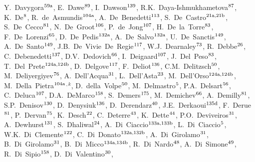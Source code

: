 \begin{flushleft}
Y.~Davygora$^\textrm{\scriptsize 59a}$,
E.~Dawe$^\textrm{\scriptsize 89}$,
I.~Dawson$^\textrm{\scriptsize 139}$,
R.K.~Daya-Ishmukhametova$^\textrm{\scriptsize 87}$,
K.~De$^\textrm{\scriptsize 8}$,
R.~de~Asmundis$^\textrm{\scriptsize 104a}$,
A.~De~Benedetti$^\textrm{\scriptsize 113}$,
S.~De~Castro$^\textrm{\scriptsize 21a,21b}$,
S.~De~Cecco$^\textrm{\scriptsize 81}$,
N.~De~Groot$^\textrm{\scriptsize 106}$,
P.~de~Jong$^\textrm{\scriptsize 107}$,
H.~De~la~Torre$^\textrm{\scriptsize 83}$,
F.~De~Lorenzi$^\textrm{\scriptsize 65}$,
D.~De~Pedis$^\textrm{\scriptsize 132a}$,
A.~De~Salvo$^\textrm{\scriptsize 132a}$,
U.~De~Sanctis$^\textrm{\scriptsize 149}$,
A.~De~Santo$^\textrm{\scriptsize 149}$,
J.B.~De~Vivie~De~Regie$^\textrm{\scriptsize 117}$,
W.J.~Dearnaley$^\textrm{\scriptsize 73}$,
R.~Debbe$^\textrm{\scriptsize 26}$,
C.~Debenedetti$^\textrm{\scriptsize 137}$,
D.V.~Dedovich$^\textrm{\scriptsize 66}$,
I.~Deigaard$^\textrm{\scriptsize 107}$,
J.~Del~Peso$^\textrm{\scriptsize 83}$,
T.~Del~Prete$^\textrm{\scriptsize 124a,124b}$,
D.~Delgove$^\textrm{\scriptsize 117}$,
F.~Deliot$^\textrm{\scriptsize 136}$,
C.M.~Delitzsch$^\textrm{\scriptsize 50}$,
M.~Deliyergiyev$^\textrm{\scriptsize 76}$,
A.~Dell'Acqua$^\textrm{\scriptsize 31}$,
L.~Dell'Asta$^\textrm{\scriptsize 23}$,
M.~Dell'Orso$^\textrm{\scriptsize 124a,124b}$,
M.~Della~Pietra$^\textrm{\scriptsize 104a}$$^{,k}$,
D.~della~Volpe$^\textrm{\scriptsize 50}$,
M.~Delmastro$^\textrm{\scriptsize 5}$,
P.A.~Delsart$^\textrm{\scriptsize 56}$,
C.~Deluca$^\textrm{\scriptsize 107}$,
D.A.~DeMarco$^\textrm{\scriptsize 158}$,
S.~Demers$^\textrm{\scriptsize 175}$,
M.~Demichev$^\textrm{\scriptsize 66}$,
A.~Demilly$^\textrm{\scriptsize 81}$,
S.P.~Denisov$^\textrm{\scriptsize 130}$,
D.~Denysiuk$^\textrm{\scriptsize 136}$,
D.~Derendarz$^\textrm{\scriptsize 40}$,
J.E.~Derkaoui$^\textrm{\scriptsize 135d}$,
F.~Derue$^\textrm{\scriptsize 81}$,
P.~Dervan$^\textrm{\scriptsize 75}$,
K.~Desch$^\textrm{\scriptsize 22}$,
C.~Deterre$^\textrm{\scriptsize 43}$,
K.~Dette$^\textrm{\scriptsize 44}$,
P.O.~Deviveiros$^\textrm{\scriptsize 31}$,
A.~Dewhurst$^\textrm{\scriptsize 131}$,
S.~Dhaliwal$^\textrm{\scriptsize 24}$,
A.~Di~Ciaccio$^\textrm{\scriptsize 133a,133b}$,
L.~Di~Ciaccio$^\textrm{\scriptsize 5}$,
W.K.~Di~Clemente$^\textrm{\scriptsize 122}$,
C.~Di~Donato$^\textrm{\scriptsize 132a,132b}$,
A.~Di~Girolamo$^\textrm{\scriptsize 31}$,
B.~Di~Girolamo$^\textrm{\scriptsize 31}$,
B.~Di~Micco$^\textrm{\scriptsize 134a,134b}$,
R.~Di~Nardo$^\textrm{\scriptsize 48}$,
A.~Di~Simone$^\textrm{\scriptsize 49}$,
R.~Di~Sipio$^\textrm{\scriptsize 158}$,
D.~Di~Valentino$^\textrm{\scriptsize 30}$,
$$
\end{flushleft}
